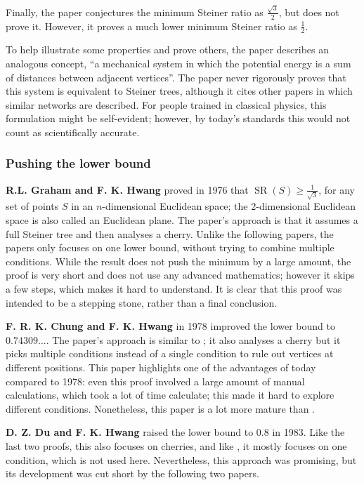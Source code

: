\documentclass{mpaper}
\begin{document}
Finally, the paper conjectures the minimum Steiner ratio as $\frac{\sqrt{3}}{2}$, but does not prove it. However, it proves a much lower minimum Steiner ratio as $\frac{1}{2}$. %

To help illustrate some properties and prove others, the paper describes an analogous concept, ``a mechanical system in which the potential energy is a sum of distances between adjacent vertices''. The paper never rigorously proves that this system is equivalent to Steiner trees, although it cites other papers in which similar networks are described. For people trained in classical physics, this formulation might be self-evident; however, by today's standards this would not count as scientifically accurate.


\subsubsection{Pushing the lower bound}
\textbf {R.L. Graham and F. K. Hwang} \cite{1/sqrt3} proved in 1976 that $\operatorname{SR}(S)\geq\frac{1}{\sqrt{3}}$, for any set of points $S$ in an $n$-dimensional Euclidean space; the 2-dimensional Euclidean space is also called an Euclidean plane.  The paper's approach is that it assumes a full Steiner tree and then analyses a cherry. Unlike the following papers, the papers only focuses on one lower bound, without trying to combine multiple conditions. While the result does not push the minimum by a large amount, the proof is very short and does not use any advanced mathematics; however it skips a few steps, which makes it hard to understand. It is clear that this proof was intended to be a stepping stone, rather than a final conclusion. 

\textbf{F. R. K. Chung and F. K. Hwang} \cite{3a161666-bf4c-3db7-b5bc-795aa21aed1b}  in 1978 improved the lower bound to $0.74309\dots$. The paper's approach is similar to \cite{1/sqrt3}; it also analyses a cherry but it picks multiple conditions instead of a single condition to rule out vertices at different positions. This paper highlights one of the advantages of today compared to 1978: even this proof involved a large amount of manual calculations, which took a lot of time calculate; this made it hard to explore different conditions. Nonetheless, this paper is a lot more mature than \cite{1/sqrt3}.

\textbf{D. Z. Du and F. K. Hwang} \cite{d6ebcb0d-eded-3f80-b57b-cda0b84fa6c0} raised the lower bound to 0.8 in 1983. Like the last two proofs, this also focuses on cherries, and like \cite{1/sqrt3}, it mostly focuses on one condition, which is not used here. Nevertheless, this approach was promising, but its development was cut short by the following two papers.
\end{document}
